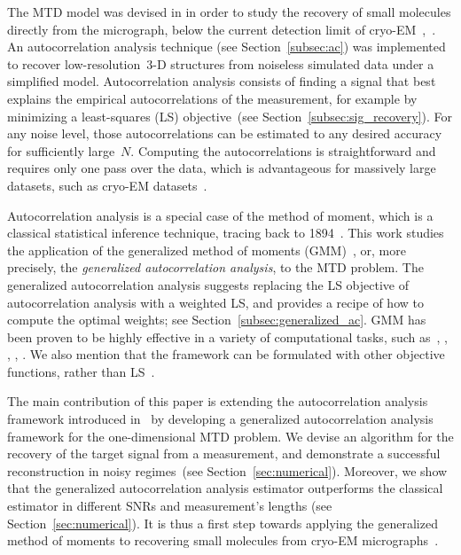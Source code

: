 \documentclass{article}
\begin{document}
The MTD model was devised in \cite{bendory2018toward} in order to study the recovery of small molecules directly from the micrograph, below the current detection limit of \mbox{cryo-EM}~\cite{henderson1995potential},~\cite{d2021current}. An autocorrelation analysis technique (see Section~\ref{subsec:ac}) was implemented to recover \mbox{low-resolution}~\mbox{3-D} structures from noiseless simulated data under a simplified model. Autocorrelation analysis consists of finding a signal that best explains the empirical autocorrelations of the measurement, for example by minimizing a {least-squares} (LS) objective~(see Section~\ref{subsec:sig_recovery}). For any noise level, those autocorrelations can be estimated to any desired accuracy for sufficiently large~$N$. Computing the autocorrelations is straightforward and requires only one pass over the data, which is advantageous for massively large datasets, such as \mbox{cryo-EM} datasets~\cite{bendory2020single}.

Autocorrelation analysis is a special case of the method of moment, which is a classical statistical inference technique, tracing back to 1894~\cite{pearson1894contributions}. This work studies the application of the generalized method of moments (GMM)~\cite{Hansen1982}, or, more precisely, the \textit{generalized autocorrelation analysis}, to the MTD problem. The generalized autocorrelation analysis suggests replacing the LS objective of autocorrelation analysis with a weighted LS, and provides a recipe of how to compute the optimal weights; see Section~\ref{subsec:generalized_ac}. GMM has been proven to be highly effective in a variety of computational tasks, such as~\cite{wooldridge2001applications}, \cite{akbar2016more}, \cite{fan2018optimal}, \cite{roodman2009xtabond2}, \cite{abas2021generalized}. We also mention that the framework can be formulated with other objective functions, rather than LS~\cite{de2002properties}.

The main contribution of this paper is extending the autocorrelation analysis framework introduced in~\cite{bendory2019multi} by developing a generalized autocorrelation analysis framework for the one-dimensional MTD problem. We devise an algorithm for the recovery of the target signal from a measurement, and demonstrate a successful reconstruction in noisy regimes~(see Section~\ref{sec:numerical}). Moreover, we show that the generalized autocorrelation analysis estimator outperforms the classical estimator in different SNRs and measurement's lengths (see Section~\ref{sec:numerical}). It is thus a first step towards applying the generalized method of moments to recovering small molecules from \mbox{cryo-EM} micrographs~\cite{bendory2018toward}.
\end{document}

